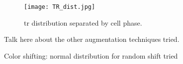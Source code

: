 \begin{figure}[htb]
  \centering
  \texttt{[image: TR\_dist.jpg]}
  \caption{\gls{tr} distribution separated by cell phase.}
  \label{fig:dataset:discus:tr_dist}
\end{figure}



Talk here about the other augmentation techniques tried.

Color shifting: normal distribution for random shift tried 

